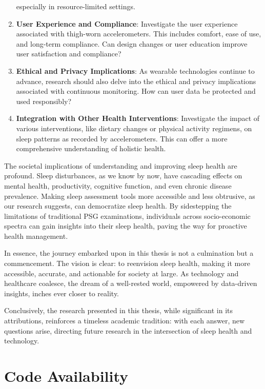 \documentclass[
  10pt,
]{scrbook}
\let\originaltextbf\textbf
\renewcommand{\textbf}[1]{\textcolor{color1}{\originaltextbf{#1}}}
\begin{document}
\begin{enumerate}
  especially in resource-limited settings.
\item
  \textbf{User Experience and Compliance}: Investigate the user
  experience associated with thigh-worn accelerometers. This includes
  comfort, ease of use, and long-term compliance. Can design changes or
  user education improve user satisfaction and compliance?
\item
  \textbf{Ethical and Privacy Implications}: As wearable technologies
  continue to advance, research should also delve into the ethical and
  privacy implications associated with continuous monitoring. How can
  user data be protected and used responsibly?
\item
  \textbf{Integration with Other Health Interventions}: Investigate the
  impact of various interventions, like dietary changes or physical
  activity regimens, on sleep patterns as recorded by accelerometers.
  This can offer a more comprehensive understanding of holistic health.
\end{enumerate}

The societal implications of understanding and improving sleep health
are profound. Sleep disturbances, as we know by now, have cascading
effects on mental health, productivity, cognitive function, and even
chronic disease prevalence. Making sleep assessment tools more
accessible and less obtrusive, as our research suggests, can democratize
sleep health. By sidestepping the limitations of traditional PSG
examinations, individuals across socio-economic spectra can gain
insights into their sleep health, paving the way for proactive health
management.

In essence, the journey embarked upon in this thesis is not a
culmination but a commencement. The vision is clear: to reenvision sleep
health, making it more accessible, accurate, and actionable for society
at large. As technology and healthcare coalesce, the dream of a
well-rested world, empowered by data-driven insights, inches ever closer
to reality.

Conclusively, the research presented in this thesis, while significant
in its attributions, reinforces a timeless academic tradition: with each
answer, new questions arise, directing future research in the
intersection of sleep health and technology.

\hypertarget{code-availability}{%
\chapter{Code Availability}\label{code-availability}}
\end{document}
